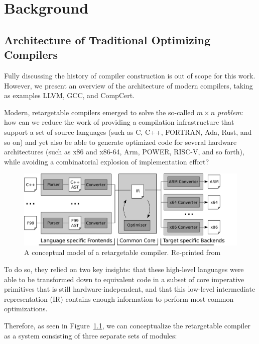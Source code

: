 \chapter{Background} \label{chap:sota-bg}

\section{Architecture of Traditional Optimizing Compilers}

Fully discussing the history of compiler construction is out of scope for this work. However, we present an overview of the architecture of modern compilers, taking as examples LLVM, GCC, and CompCert.

Modern, retargetable compilers emerged to solve the so-called \textit{$m \times n$ problem}: how can we reduce the work of providing a compilation infrastructure that support a set of source languages (such as C, C++, FORTRAN, Ada, Rust, and so on) and yet also be able to generate optimized code for several hardware architectures (such as x86 and x86-64, Arm, POWER, RISC-V, and so forth), while avoiding a combinatorial explosion of implementation effort?

\begin{figure}
    \centering
    \includegraphics[width=\textwidth]{figures/generic_compiler_arch.png}
    \caption{A conceptual model of a retargetable compiler. Re-printed from \cite{Zangerl2018}}
    \label{fig:generic_compiler}
\end{figure}

To do so, they relied on two key insights: that these high-level languages were able to be transformed down to equivalent code in a subset of core imperative primitives that is still hardware-independent, and that this low-level intermediate representation (IR) contains enough information to perform most common optimizations.

Therefore, as seen in Figure~\ref{fig:generic_compiler}, we can conceptualize the retargetable compiler as a system consisting of three separate sets of modules:

